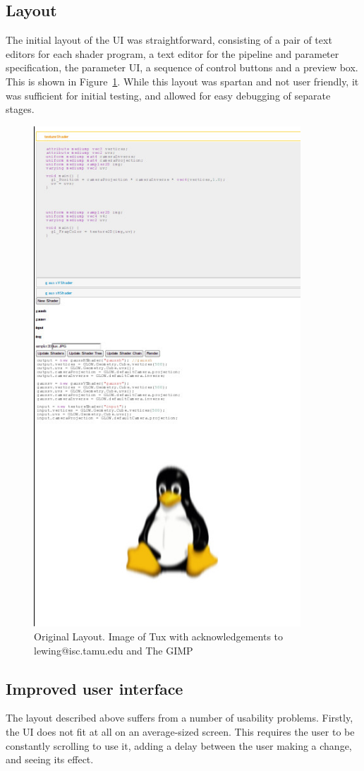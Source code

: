 \documentclass[12pt,twoside,notitlepage]{report}
\begin{document}
\subsection{Layout}
The initial layout of the UI was straightforward, consisting of a pair of text editors for each shader program, a text editor for the pipeline and parameter specification, the parameter UI, a sequence of control buttons and a preview box. This is shown in Figure~\ref{bad-ui}. While this layout was spartan and not user friendly, it was sufficient for initial testing, and allowed for easy debugging of separate stages.
\begin{figure}
\centering
\includegraphics[width=100mm]{UI-before.JPG}
\caption{Original Layout. Image of Tux with acknowledgements to lewing@isc.tamu.edu and The GIMP\label{bad-ui}}
\end{figure}


\subsection{Improved user interface}
The layout described above suffers from a number of usability problems. Firstly, the UI does not fit at all on an average-sized screen. This requires the user to be constantly scrolling to use it, adding a delay between the user making a change, and seeing its effect. 
\end{document}
